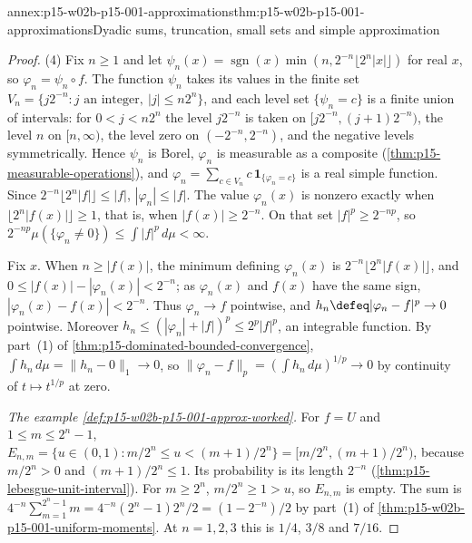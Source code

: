 \begin{annexitem}{annex:p15-w02b-p15-001-approximations}{thm:p15-w02b-p15-001-approximations}{Dyadic sums, truncation, small sets and simple approximation}
\begin{proof}
(4) Fix \(n\geq1\) and let
\(\psi_n(x)=\operatorname{sgn}(x)\min(n,2^{-n}\lfloor2^n|x|\rfloor)\)
for real \(x\), so \(\varphi_n=\psi_n\circ f\). The function \(\psi_n\)
takes its values in the finite set
\(V_n=\{j2^{-n}:j\text{ an integer},\ |j|\leq n2^n\}\), and each level
set \(\{\psi_n=c\}\) is a finite union of intervals: for
\(0<j<n2^n\) the level \(j2^{-n}\) is taken on \([j2^{-n},(j+1)2^{-n})\),
the level \(n\) on \([n,\infty)\), the level zero on
\((-2^{-n},2^{-n})\), and the negative levels symmetrically. Hence
\(\psi_n\) is Borel, \(\varphi_n\) is measurable as a composite
(\cref{thm:p15-measurable-operations}), and
\(\varphi_n=\sum_{c\in V_n}c\,\mathbf1_{\{\varphi_n=c\}}\) is a real
simple function. Since \(2^{-n}\lfloor2^n|f|\rfloor\leq|f|\),
\(|\varphi_n|\leq|f|\). The value \(\varphi_n(x)\) is nonzero exactly
when \(\lfloor2^n|f(x)|\rfloor\geq1\), that is, when
\(|f(x)|\geq2^{-n}\). On that set \(|f|^p\geq2^{-np}\), so
\(2^{-np}\mu(\{\varphi_n\neq0\})\leq\int|f|^p\,d\mu<\infty\).

Fix \(x\). When \(n\geq|f(x)|\), the minimum defining \(\varphi_n(x)\) is
\(2^{-n}\lfloor2^n|f(x)|\rfloor\), and
\(0\leq|f(x)|-|\varphi_n(x)|<2^{-n}\); as \(\varphi_n(x)\) and
\(f(x)\) have the same sign, \(|\varphi_n(x)-f(x)|<2^{-n}\). Thus
\(\varphi_n\to f\) pointwise, and \(h_n\defeq|\varphi_n-f|^p\to0\)
pointwise. Moreover
\(h_n\leq(|\varphi_n|+|f|)^p\leq2^p|f|^p\), an integrable function. By
part~(1) of \cref{thm:p15-dominated-bounded-convergence},
\(\int h_n\,d\mu=\|h_n-0\|_1\to0\), so
\(\|\varphi_n-f\|_p=(\int h_n\,d\mu)^{1/p}\to0\) by continuity of
\(t\mapsto t^{1/p}\) at zero.

\emph{The example \cref{def:p15-w02b-p15-001-approx-worked}.} For
\(f=U\) and \(1\leq m\leq2^n-1\), \(E_{n,m}=\{u\in(0,1):
m/2^n\leq u<(m+1)/2^n\}=[m/2^n,(m+1)/2^n)\), because
\(m/2^n>0\) and \((m+1)/2^n\leq1\). Its probability is its length
\(2^{-n}\) (\cref{thm:p15-lebesgue-unit-interval}). For \(m\geq2^n\),
\(m/2^n\geq1>u\), so \(E_{n,m}\) is empty. The sum is
\(4^{-n}\sum_{m=1}^{2^n-1}m=4^{-n}(2^n-1)2^n/2=(1-2^{-n})/2\) by
part~(1) of \cref{thm:p15-w02b-p15-001-uniform-moments}. At
\(n=1,2,3\) this is \(1/4\), \(3/8\) and \(7/16\).


\end{proof}
\end{annexitem}
